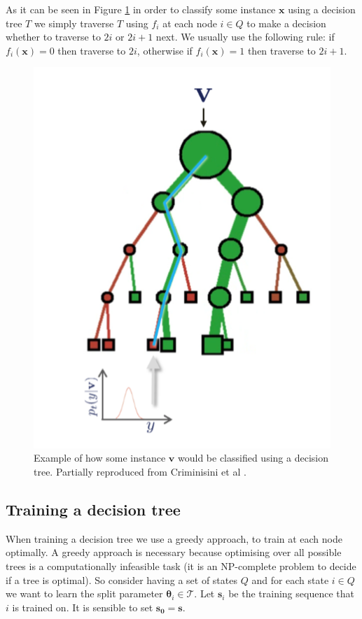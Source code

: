\documentclass[12pt,twoside,notitlepage]{report}
\newcommand{\vc}[1]{\mathbf{#1}}
\newcommand{\cl}[1]{\mathcal{#1}}
\begin{document}
            As it can be seen in Figure \ref{fig:decision_tree_classify} in order to classify some instance $\vc{x}$ using a 
            decision tree $T$ we simply traverse $T$ using $f_i$ at each node $i \in Q$ to make a decision whether 
            to traverse to $2i$ or $2i+1$ next. We usually use the following rule: if $f_i(\vc{x}) = 0$ then traverse to 
            $2i$, otherwise if $f_i(\vc{x}) = 1$ then traverse to $2i+1$. \cite{criminisi2013decision}

            \begin{figure}
                \centering
                \includegraphics[scale=0.5]{tree_example_classification}
                \caption[Example of how some instance $\vc{v}$ would be classified using a decision tree.]{Example of how some instance $\vc{v}$ would be classified using a decision tree. Partially reproduced from Criminisini et al \cite{criminisi2012decision}.}
                \label{fig:decision_tree_classify}
            \end{figure}

        \subsection{Training a decision tree}
            When training a decision tree we use a greedy approach, to train at each node optimally. A 
            greedy approach is necessary because optimising over all possible trees is a computationally infeasible task (it is an 
            NP-complete problem to decide if a tree is optimal). So consider having a set of states $Q$ and for each state
            $i \in Q$ we want to learn the split parameter $\vc{\theta}_i \in \cl{T}$. Let $\vc{s}_i$ be the training 
            sequence that $i$ is trained on. It is sensible to set $\vc{s_0}=\vc{s}$. 
\end{document}
